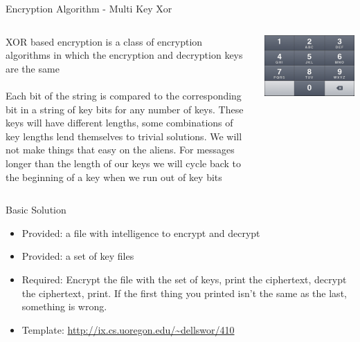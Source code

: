 \documentclass[xcolor=dvipsnames]{beamer}
\begin{document}
  \begin{frame}{Encryption Algorithm - Multi Key Xor}
		\begin{columns}
			\begin{column}{0.5\textwidth}
          XOR based encryption is a class of encryption algorithms in which the encryption
          and decryption keys are the same
					\\~\\
			    Each bit of the string is compared to the corresponding bit in a string of key
          bits for any number of keys. These keys will have different lengths,
          some combinations of key lengths lend themselves to trivial solutions. We will
          not make things that easy on the aliens. For messages longer than the length of
          our keys we will cycle back to the beginning of a key when we run out of key bits
      \end{column}
			\begin{column}{0.5\textwidth}
				\includegraphics[width=\textwidth]{images/keypad}
			\end{column}
		\end{columns}
	\end{frame}
	
	\begin{frame}{Basic Solution}
		\begin{itemize}
			\item Provided: a file with intelligence to encrypt and decrypt
      \item Provided: a set of key files
			\item Required: Encrypt the file with the set of keys, print the ciphertext, decrypt the  ciphertext, print. If the first thing you printed isn't the same as the last, something is wrong.
			\item Template: \href{http://ix.cs.uoregon.edu/~dellswor/410}{\url{http://ix.cs.uoregon.edu/~dellswor/410}}
		\end{itemize}
	\end{frame}
	
\end{document}
